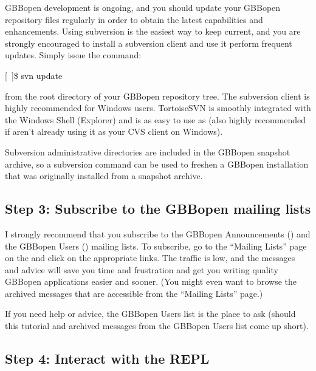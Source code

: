 \documentclass[10pt,twoside,english,pdftex]{article}
\begin{document}
%
%
%
%
%
GBBopen development is ongoing, and you should update your GBBopen repository
files regularly in order to obtain the latest capabilities and enhancements.
Using subversion is the easiest way to keep current, and you are strongly
encouraged to install a subversion client and use it perform frequent updates.
Simply issue the command:
%
\W\supp
\begin{example}
\textcolor{darkergray}{%
  [~]\$ \textcolor{black}{svn update}}
\end{example}
%
from the root directory of your GBBopen repository tree.  
The  subversion
client is highly recommended for Windows users.  TortoiseSVN is
smoothly integrated with the Windows Shell (Explorer) and is as easy
to use as  (also
highly recommended if aren't already using it as your CVS client on
Windows).

Subversion  administrative directories are included in the
GBBopen snapshot archive, so a subversion  command can be
used to freshen a GBBopen installation that was originally installed
from a snapshot archive.

\subsection*{Step 3: Subscribe to the GBBopen mailing lists}

%
I strongly recommend that you subscribe to the GBBopen Announcements
() and the GBBopen Users () mailing
lists.  To subscribe, go to the ``Mailing Lists'' page on the
 and click on the appropriate
 links.  The traffic is low, and the messages and advice will
save you time and frustration and get you writing quality GBBopen applications
easier and sooner.  (You might even want to browse the archived messages that
are accessible from the ``Mailing Lists'' page.)

If you need help or advice, the GBBopen Users list is the place to ask (should
this tutorial and archived messages from the GBBopen Users list come up
short).

\subsection*{Step 4: Interact with the REPL}
\end{document}
